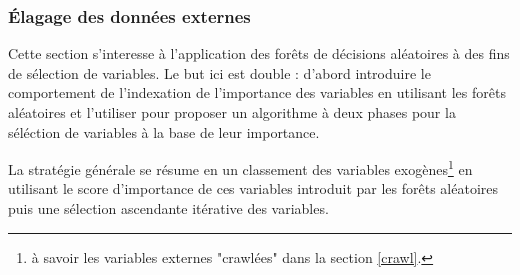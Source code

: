 	\subsubsection{Élagage des données externes}
	Cette section s'interesse à l'application des forêts de décisions aléatoires à des fins de sélection de variables. Le but ici est double : d'abord introduire le comportement de l'indexation de l'importance des variables en utilisant les forêts aléatoires et l'utiliser pour proposer un algorithme à deux phases pour la séléction de variables à la base de leur importance.\par
	La stratégie générale se résume en un classement des variables exogènes\footnote{à savoir les variables externes "crawlées" dans la section \ref{crawl}.} en utilisant le score d'importance de ces variables introduit par les forêts aléatoires puis une sélection ascendante itérative des variables.
